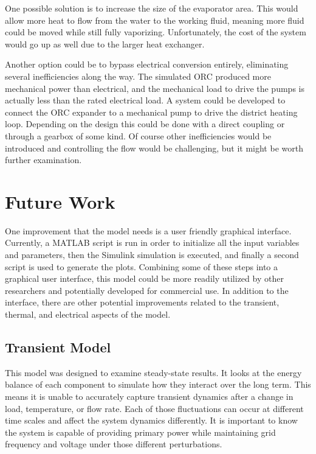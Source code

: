One possible solution is to increase the size of the evaporator area. This would allow more heat to flow from the water to the working fluid, meaning more fluid could be moved while still fully vaporizing. Unfortunately, the cost of the system would go up as well due to the larger heat exchanger.

Another option could be to bypass electrical conversion entirely, eliminating several inefficiencies along the way. The simulated ORC produced more mechanical power than electrical, and the mechanical load to drive the pumps is actually less than the rated electrical load.
A system could be developed to connect the ORC expander to a mechanical pump to drive the district heating loop. Depending on the design this could be done with a direct coupling or through a gearbox of some kind. Of course other inefficiencies would be introduced and controlling the flow would be challenging, but it might be worth further examination.

\section{Future Work}
One improvement that the model needs is a user friendly graphical interface. Currently, a MATLAB\textsuperscript{\textregistered} script is run in order to initialize all the input variables and parameters, then the Simulink simulation is executed, and finally a second script is used to generate the plots. Combining some of these steps into a graphical user interface, this model could be more readily utilized by other researchers and potentially developed for commercial use. In addition to the interface, there are other potential improvements related to the transient, thermal, and electrical aspects of the model.

\subsection{Transient Model}
This model was designed to examine steady-state results. It looks at the energy balance of each component to simulate how they interact over the long term. This means it is unable to accurately capture transient dynamics after a change in load, temperature, or flow rate. Each of those fluctuations can occur at different time scales and affect the system dynamics differently. It is important to know the system is capable of providing primary power while maintaining grid frequency and voltage under those different perturbations.

